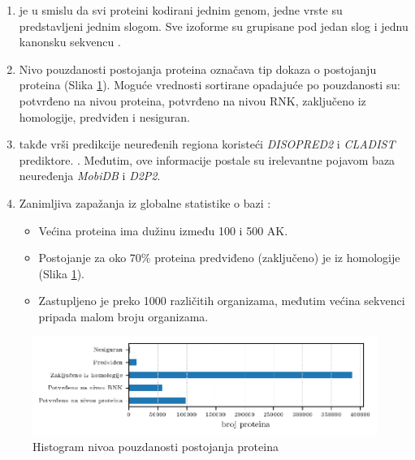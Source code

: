 \begin{enumerate}
  \item
    \label{red}
    \swissprot je  u smislu da svi proteini
    kodirani jednim genom, jedne vrste su predstavljeni jednim slogom. Sve
    izoforme su grupisane pod jedan slog i jednu kanonsku sekvencu \parencite{nonRedundant}.

  \item Nivo pouzdanosti postojanja proteina  
    označava tip dokaza o postojanju proteina (Slika \ref{fig:PE}). Moguće
    vrednosti sortirane opadajuće po pouzdanosti su: potvrđeno na nivou
    proteina, potvrđeno na nivou RNK, zaključeno iz homologije, predviđen i
    nesiguran. 

  \clearpage


  \item
    \swissprot takđe vrši predikcije neuređenih regiona koristeći \textit{DISOPRED2}
    i \textit{CLADIST} prediktore. \parencite{Meng_c2017}. Međutim, ove informacije
    postale su irelevantne pojavom baza neuređenja \textit{MobiDB}\parencite{Piovesan2017} i \textit{D2P2}\parencite{Oates2012}.

  \item Zanimljiva zapažanja iz globalne statistike o bazi \swissprot:
    \begin{itemize}
      \item Većina proteina ima dužinu između 100 i 500 AK.
      \item Postojanje za oko $70\%$ proteina predviđeno (zaključeno) je iz
        homologije (Slika \ref{fig:PE}).
      \item Zastupljeno je preko 1000 različitih organizama, međutim
        većina \swissprot sekvenci pripada malom broju organizama.
    \end{itemize}
      


\end{enumerate}

\begin{figure}[h!]
  \centering
  \hspace*{-0.2cm} 
  \includegraphics[]{plots/PE.pdf}
  \caption{Histogram nivoa pouzdanosti postojanja \swissprot proteina}
  \label{fig:PE}
\end{figure}

%
%
%













